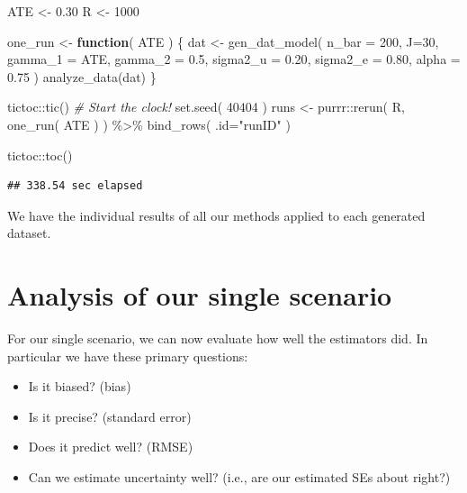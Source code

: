 \documentclass[
]{book}
\newenvironment{Shaded}{\begin{snugshade}}{\end{snugshade}}
\newcommand{\AttributeTok}[1]{\textcolor[rgb]{0.77,0.63,0.00}{#1}}
\newcommand{\CommentTok}[1]{\textcolor[rgb]{0.56,0.35,0.01}{\textit{#1}}}
\newcommand{\ControlFlowTok}[1]{\textcolor[rgb]{0.13,0.29,0.53}{\textbf{#1}}}
\newcommand{\DecValTok}[1]{\textcolor[rgb]{0.00,0.00,0.81}{#1}}
\newcommand{\FloatTok}[1]{\textcolor[rgb]{0.00,0.00,0.81}{#1}}
\newcommand{\FunctionTok}[1]{\textcolor[rgb]{0.00,0.00,0.00}{#1}}
\newcommand{\NormalTok}[1]{#1}
\newcommand{\OtherTok}[1]{\textcolor[rgb]{0.56,0.35,0.01}{#1}}
\newcommand{\SpecialCharTok}[1]{\textcolor[rgb]{0.00,0.00,0.00}{#1}}
\newcommand{\StringTok}[1]{\textcolor[rgb]{0.31,0.60,0.02}{#1}}
\providecommand{\tightlist}{%
  \setlength{\itemsep}{0pt}\setlength{\parskip}{0pt}}
\begin{document}
\begin{Shaded}
\begin{Highlighting}[]
\NormalTok{ATE }\OtherTok{\textless{}{-}} \FloatTok{0.30}
\NormalTok{R }\OtherTok{\textless{}{-}} \DecValTok{1000}

\NormalTok{one\_run }\OtherTok{\textless{}{-}} \ControlFlowTok{function}\NormalTok{( ATE ) \{}
\NormalTok{      dat }\OtherTok{\textless{}{-}} \FunctionTok{gen\_dat\_model}\NormalTok{( }\AttributeTok{n\_bar =} \DecValTok{200}\NormalTok{, }\AttributeTok{J=}\DecValTok{30}\NormalTok{, }
                          \AttributeTok{gamma\_1 =}\NormalTok{ ATE, }\AttributeTok{gamma\_2 =} \FloatTok{0.5}\NormalTok{,}
                          \AttributeTok{sigma2\_u =} \FloatTok{0.20}\NormalTok{, }\AttributeTok{sigma2\_e =} \FloatTok{0.80}\NormalTok{,}
                          \AttributeTok{alpha =} \FloatTok{0.75}\NormalTok{ )}
    \FunctionTok{analyze\_data}\NormalTok{(dat)  }
\NormalTok{\}}

\NormalTok{tictoc}\SpecialCharTok{::}\FunctionTok{tic}\NormalTok{()  }\CommentTok{\# Start the clock!}
\FunctionTok{set.seed}\NormalTok{( }\DecValTok{40404}\NormalTok{ )}
\NormalTok{runs }\OtherTok{\textless{}{-}} 
\NormalTok{  purrr}\SpecialCharTok{::}\FunctionTok{rerun}\NormalTok{( R, }\FunctionTok{one\_run}\NormalTok{( ATE ) ) }\SpecialCharTok{\%\textgreater{}\%}
  \FunctionTok{bind\_rows}\NormalTok{( }\AttributeTok{.id=}\StringTok{"runID"}\NormalTok{ )}

\NormalTok{tictoc}\SpecialCharTok{::}\FunctionTok{toc}\NormalTok{()}
\end{Highlighting}
\end{Shaded}

\begin{verbatim}
## 338.54 sec elapsed
\end{verbatim}

We have the individual results of all our methods applied to each generated dataset.

\hypertarget{analysis-of-our-single-scenario}{%
\section{Analysis of our single scenario}\label{analysis-of-our-single-scenario}}

For our single scenario, we can now evaluate how well the estimators did.
In particular we have these primary questions:

\begin{itemize}
\tightlist
\item
  Is it biased? (bias)
\item
  Is it precise? (standard error)
\item
  Does it predict well? (RMSE)
\item
  Can we estimate uncertainty well? (i.e., are our estimated SEs about right?)
\end{itemize}
\end{document}

